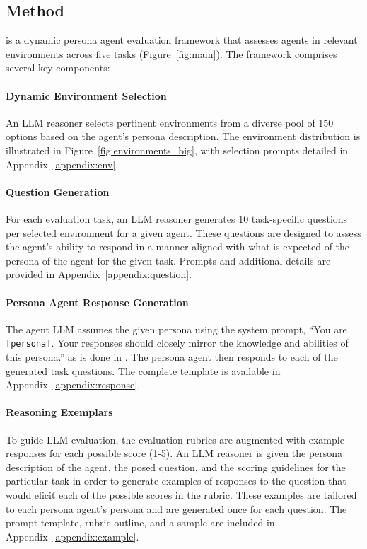 \subsection{Method}
\benchmark is a dynamic persona agent evaluation framework that assesses agents in relevant environments across five tasks (Figure~\ref{fig:main}). The framework comprises several key components:

\paragraph{Dynamic Environment Selection} An LLM reasoner selects pertinent environments from a diverse pool of 150 options based on the agent's persona description. The environment distribution is illustrated in Figure~\ref{fig:environments_big}, with selection prompts detailed in Appendix~\ref{appendix:env}.

\paragraph{Question Generation} For each evaluation task, an LLM reasoner generates 10 task-specific questions per selected environment for a given agent. These questions are designed to assess the agent's ability to respond in a manner aligned with what is expected of the persona of the agent for the given task. Prompts and additional details are provided in Appendix~\ref{appendix:question}.

\paragraph{Persona Agent Response Generation} The agent LLM assumes the given persona using the system prompt, ``You are \texttt{[persona]}. Your responses should closely mirror the knowledge and abilities of this persona.'' as is done in \cite{gupta2024bias}. The persona agent then responds to each of the generated task questions. The complete template is available in Appendix~\ref{appendix:response}.

\paragraph{Reasoning Exemplars} To guide LLM evaluation, the evaluation rubrics are augmented with example responses for each possible score (1-5). An LLM reasoner is given the persona description of the agent, the posed question, and the scoring guidelines for the particular task in order to generate examples of responses to the question that would elicit each of the possible scores in the rubric. These examples are tailored to each persona agent's persona and are generated once for each question. The prompt template, rubric outline, and a sample are included in Appendix~\ref{appendix:example}.

